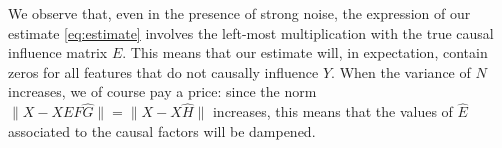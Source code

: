 \documentclass{article}
\begin{document}
We observe that, even in the presence of strong noise, the expression of our estimate \eqref{eq:estimate} involves the left-most multiplication with the true causal influence matrix $E$.
%
This means that our estimate will, in expectation, contain zeros for all features that do not causally influence $Y$.
%
When the variance of $N$ increases, we of course pay a price: since the norm $\| X - XEF\hat{G} \| = \| X - X\hat{H} \|$ increases, this means that the values of $\hat{E}$ associated to the causal factors will be dampened.

\end{document}

